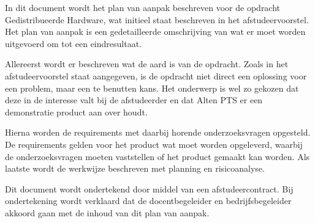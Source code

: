 \documentclass{../local}
\begin{document}
In dit document wordt het plan van aanpak beschreven voor de opdracht Gedistribueerde Hardware, wat initieel staat beschreven in het afstudeervoorstel. Het plan van aanpak is een gedetailleerde omschrijving van wat er moet worden uitgevoerd om tot een eindresultaat.

Allereerst wordt er beschreven wat de aard is van de opdracht. Zoals in het afstudeervoorstel staat aangegeven, is de opdracht niet direct een oplossing voor een problem, maar een te benutten kans. Het onderwerp is wel zo gekozen dat deze in de interesse valt bij de afstudeerder en dat Alten PTS er een demonstratie product aan over houdt. 

Hierna worden de requirements met daarbij horende onderzoeksvragen opgesteld. De requirements gelden voor het product wat moet worden opgeleverd, waarbij de onderzoeksvragen moeten vaststellen of het product gemaakt kan worden. Als laatste wordt de werkwijze beschreven met planning en risicoanalyse.

Dit document wordt ondertekend door middel van een afstudeercontract. Bij ondertekening wordt verklaard dat de docentbegeleider en bedrijfsbegeleider akkoord gaan met de inhoud van dit plan van aanpak.
\end{document}
